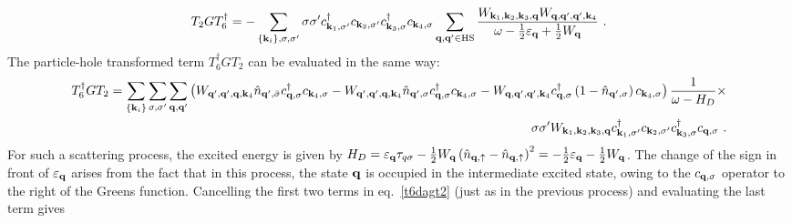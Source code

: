 \documentclass{revtex4-2}
\begin{document}
\begin{equation}\begin{aligned}\label{t2t61}
		T_2 G T_6^\dagger = -\sum_{\left\{{\bf k}_i\right\}, \sigma, \sigma^\prime} \sigma\sigma^\prime c^\dagger_{{\bf k}_1,\sigma^\prime}c_{{\bf k}_2,\sigma^\prime} c^\dagger_{{\bf k}_3,\sigma} c_{{\bf k}_4,\sigma}\sum_{{\bf q}, {\bf q}^\prime\in\text{HS}}\frac{W_{{\bf k}_1,{\bf k}_2,{\bf k}_3,{\bf q}} W_{{\bf q},{{\bf q}^\prime},{{\bf q}^\prime},{\bf k}_4}}{\omega - \frac{1}{2}\varepsilon_{{\bf q}} + \frac{1}{2}W_{{\bf q}}}  ~.
\end{aligned}\end{equation}
The particle-hole transformed term \(T_6^\dagger G T_2\) can be evaluated in the same way:
\begin{equation}\begin{aligned}\label{t6dagt2}
	T_6^\dagger G T_2 = \sum_{\left\{ {\bf k}_i \right\} }\sum_{\sigma,\sigma^\prime}\sum_{{\bf q}, {\bf q}^\prime} \left(W_{{{\bf q}^\prime},{{\bf q}^\prime},{\bf q},{\bf k}_4} \hat n_{{{\bf q}^\prime},\bar\sigma}c^\dagger_{{\bf q},\sigma}c_{{\bf k}_4,\sigma} - W_{{{\bf q}^\prime},{{\bf q}^\prime},{\bf q},{\bf k}_4}\hat n_{{{\bf q}^\prime},\sigma}c^\dagger_{{\bf q},\sigma}c_{{\bf k}_4,\sigma} - W_{{\bf q},{{\bf q}^\prime},{{\bf q}^\prime},{\bf k}_4}c^\dagger_{{\bf q},\sigma}\left(1 - \hat n_{{{\bf q}^\prime},\sigma}\right) c_{{\bf k}_4,\sigma}\right)\frac{1}{\omega - H_D}\times \\
	\sigma\sigma^\prime W_{{\bf k}_1,{\bf k}_2,{\bf k}_3,{\bf q}} c^\dagger_{{\bf k}_1, \sigma^\prime}c_{{\bf k}_2,\sigma^\prime}c^\dagger_{{\bf k}_3,\sigma}c_{{\bf q},\sigma}~.
\end{aligned}\end{equation}
For such a scattering process, the excited energy is given by \(H_D = \varepsilon_{{\bf q}}\tau_{q\sigma} - \frac{1}{2}W_{{\bf q}}\left(\hat n_{{\bf q}, \uparrow} - \hat n_{{\bf q}, \uparrow}\right)^2 = -\frac{1}{2}\varepsilon_{{\bf q}} - \frac{1}{2}W_{{\bf q}}\). The change of the sign in front of \(\varepsilon_{{\bf q}}\) arises from the fact that in this process, the state \({\bf q}\) is occupied in the intermediate excited state, owing to the \(c_{{\bf q},\sigma}\) operator to the right of the Greens function. Cancelling the first two terms in eq.~\ref{t6dagt2} (just as in the previous process) and evaluating the last term gives
\end{document}
